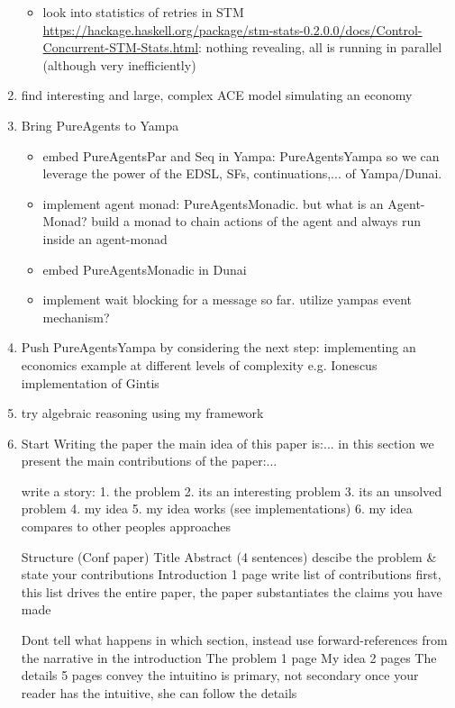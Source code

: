 \begin{enumerate}
\begin{itemize}
		\item look into statistics of retries in STM \url{https://hackage.haskell.org/package/stm-stats-0.2.0.0/docs/Control-Concurrent-STM-Stats.html}: nothing revealing, all is running in parallel (although very inefficiently)
	\end{itemize}

\item find interesting and large, complex ACE model simulating an economy

\item Bring PureAgents to Yampa
	\begin{itemize}
		\item embed PureAgentsPar and Seq in Yampa: PureAgentsYampa so we can leverage the power of the EDSL, SFs, continuations,... of Yampa/Dunai.
		\item implement agent monad: PureAgentsMonadic. but what is an Agent-Monad? build a monad to chain actions of the agent and always run inside an agent-monad
		\item embed PureAgentsMonadic in Dunai
		\item implement wait blocking for a message so far. utilize yampas event mechanism?
	\end{itemize}
	
\item Push PureAgentsYampa by considering the next step: implementing an economics example at different levels of complexity e.g. Ionescus implementation of Gintis

\item try algebraic reasoning using my framework

\item Start Writing the paper
the main idea of this paper is:...
in this section we present the main contributions of the paper:...

write a story:
	1. the problem
	2. its an interesting problem
	3. its an unsolved problem
	4. my idea
	5. my idea works (see implementations)
	6. my idea compares to other peoples approaches
	
Structure (Conf paper)
	Title
	Abstract (4 sentences)
		descibe the problem & state your contributions
	Introduction 1 page
		write list of contributions first,
		this list drives the entire paper,
		the paper substantiates the claims you have made
		
		Dont tell what happens in which section,
		instead use forward-references from the
		narrative in the introduction
	The problem 1 page
	My idea 2 pages
	The details 5 pages
		convey the intuitino is primary, not secondary
		once your reader has the intuitive, she can follow the details
		

\end{enumerate}
